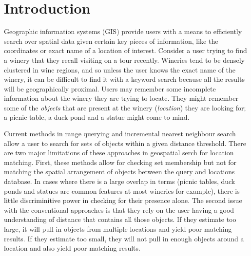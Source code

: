 \section{Introduction}
\label{section:introduction}
\par{Geographic information systems (GIS) provide users with a means to efficiently search over spatial data given certain key pieces of information, like the coordinates or exact name of a location of interest. 
Consider a user trying to find a winery that they recall visiting on a tour recently.
Wineries tend to be densely clustered in wine regions, and so unless the user knows the exact name of the winery, it can be difficult to find it with a keyword search because all the results will be geographically proximal.
Users may remember some incomplete information about the winery they are trying to locate. 
They might remember some of the \textit{objects} that are present at the winery (\textit{location}) they are looking for; a picnic table, a duck pond and a statue might come to mind.}
%
\par{Current methods in range querying and incremental nearest neighbour search allow a user to search for sets of objects within a given distance threshold. 
There are two major limitations of these approaches in geospatial serch for location matching. 
First, these methods allow for checking set membership but not for matching the spatial arrangement of objects between the query and locations database. 
In cases where there is a large overlap in terms (picnic tables, duck ponds and statues are common features at most wineries for example), there is little discriminitive power in checking for their presence alone. 
The second issue with the conventional approaches is that they rely on the user having a good understanding of distance that contains all those objects. 
If they estimate too large, it will pull in objects from multiple locations and yield poor matching results. 
If they estimate too small, they will not pull in enough objects around a location and also yield poor matching results. }
%

